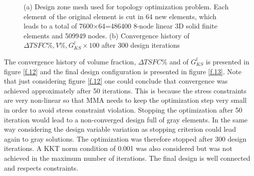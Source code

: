    \begin{figure}[hbt!]
     \centering
          \caption{(a) Design zone mesh used for  topology optimization problem. Each element of the original element is cut in 64 new elements, which leads to a total of 7600$\times$64=486400 8-node linear 3D solid finite elements and  509949 nodes. (b) Convergence history of $\Delta TSFC \%, V \%, G^{l}_{KS}\times 100$ after 300 design iterations\label{fig2.9}} 
        \end{figure}
  The convergence history of volume fraction, $\Delta TSFC \%$ and of $G^{l}_{KS}$ is presented in figure \ref{f.12} and the final design configuration is presented in figure \ref{f.13}. Note that just considering figure  \ref{f.12} one could conclude that convergence was achieved approximately after 50 iterations. This is because the stress constraints are very non-linear so that MMA needs to keep the optimization step very small in order to avoid stress constraint violation. Stopping the optimization after 50 iteration would lead to a non-converged design full of gray elements. In the same way considering the design variable variation as stopping criterion could lead again to gray solutions. The optimization was therefore stopped after 300 design iterations. A KKT norm condition of 0.001 was also considered but was not achieved in the maximum number of iterations. The final design is well connected and respects constraints.
